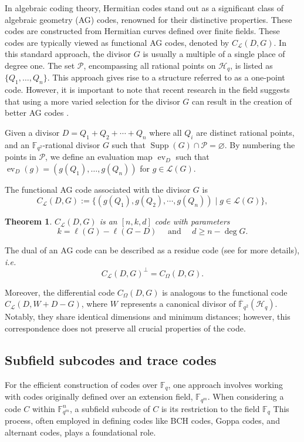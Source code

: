 \documentclass[11pt]{amsart}
\theoremstyle{plain}
\newtheorem{theorem}{Theorem}[section]
\theoremstyle{definition}
\theoremstyle{remark}
\DeclareMathOperator{\ev}{ev}
\newcommand{\calP}{\mathcal{P}}
\newcommand{\calL}{\mathcal{L}}
\newcommand{\calC}{C}
\newcommand{\Supp}{\operatorname{Supp}}
\begin{document}
In algebraic coding theory, Hermitian codes stand out as a significant class of algebraic geometry (AG) codes, renowned for their distinctive properties. These codes are constructed from Hermitian curves defined over finite fields. These codes are typically viewed as functional AG codes, denoted by $C_{\mathcal{L}}(D, G)$. In this standard approach, the divisor $G$ is usually a multiple of a single place of degree one. The set $\mathcal{P}$, encompassing all rational points on $\mathscr{H}_q$, is listed as $\{Q_1, \ldots, Q_{n}\}$. This approach gives rise to a structure referred to as a one-point code. However, it is important to note that recent research in the field suggests that using a more varied selection for the divisor $G$ can result in the creation of better AG codes \cite{matthews2005one,korchmaros2013hermitian}.



Given a divisor $D=Q_1+Q_2+\cdots+Q_n$ where all $Q_i$ are distinct rational points, and an $\mathbb{F}_{q^2}$-rational divisor $G$ such that $\Supp(G) \cap \calP = \varnothing$. By numbering the points in $\calP$, we define an evaluation map $\ev_{D}$ such that $\ev_{D}(g) = (g(Q_1),\dots,g(Q_n))$ for $g \in \calL(G)$. 


The functional AG code associated with the divisor $G$ is
\[C_{\calL}(D,G) := \{(g(Q_1),g(Q_2),\cdots,g(Q_n)) \mid g \in \calL(G)\},\]


\begin{theorem}\cite[Theorem~2.2.2]{stichtenoth2009algebraic}
	$C_{\calL}(D, G)$ is an $[n, k, d]$ code with parameters
	\[
		k=\ell(G)-\ell(G-D) \quad \text { and } \quad d \geq n-\deg G .
	\]
\end{theorem}

The dual of an AG code can be described as a residue code (see \cite{stichtenoth2009algebraic} for more details), \emph{i.e.}
\[ C_{\calL}(D,G)^{\perp} = C_{\Omega}(D,G).\]


Moreover, the differential code $C_{\Omega}(D, G)$ is analogous to the functional code $C_{\mathcal{L}}(D, W+D-G)$, where $W$ represents a canonical divisor of $\overline{\mathbb{F}}_{q^2}(\mathscr{H}_q)$. Notably, they share identical dimensions and minimum distances; however, this correspondence does not preserve all crucial properties of the code.


\subsection{Subfield subcodes and trace codes}
For the efficient construction of codes over $\mathbb{F}_q$, one approach involves working with codes originally defined over an extension field, $\mathbb{F}_{q^m}$. When considering a code $\calC$ within $\mathbb{F}_{q^m}^n$, a subfield subcode of $\calC$ is its restriction to the field $\mathbb{F}_q$
This process, often employed in defining codes like BCH codes, Goppa codes, and alternant codes, plays a foundational role.
\end{document}
